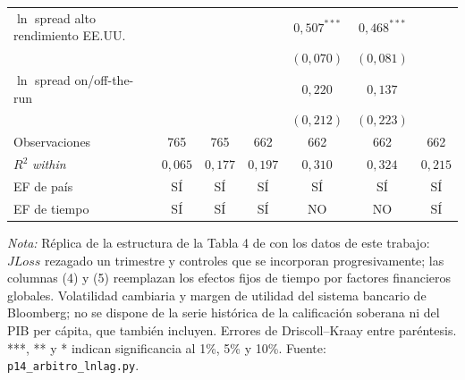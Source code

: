 \begin{table}[htbp]
\begin{tabular}{lcccccc}
$\ln$ spread alto rendimiento EE.UU. &  &  &  & $0{,}507^{***}$ & $0{,}468^{***}$ &  \\
 &  &  &  & $(0{,}070)$ & $(0{,}081)$ &  \\
$\ln$ spread on/off-the-run &  &  &  & $0{,}220$ & $0{,}137$ &  \\
 &  &  &  & $(0{,}212)$ & $(0{,}223)$ &  \\
\midrule
Observaciones & 765 & 765 & 662 & 662 & 662 & 662 \\
$R^2$ \textit{within} & $0{,}065$ & $0{,}177$ & $0{,}197$ & $0{,}310$ & $0{,}324$ & $0{,}215$ \\
EF de país & SÍ & SÍ & SÍ & SÍ & SÍ & SÍ \\
EF de tiempo & SÍ & SÍ & SÍ & NO & NO & SÍ \\
\bottomrule
\end{tabular}
\par\smallskip\parbox{0.95\linewidth}{\scriptsize \textit{Nota:} Réplica de la estructura de la Tabla 4 de \citet{Chari2024b} con los datos de este trabajo: $JLoss$ rezagado un trimestre y controles que se incorporan progresivamente; las columnas (4) y (5) reemplazan los efectos fijos de tiempo por factores financieros globales. Volatilidad cambiaria y margen de utilidad del sistema bancario de Bloomberg; no se dispone de la serie histórica de la calificación soberana ni del PIB per cápita, que \citet{Chari2024b} también incluyen. Errores de Driscoll--Kraay entre paréntesis. ***, ** y * indican significancia al 1\%, 5\% y 10\%. Fuente: \texttt{p14\_arbitro\_lnlag.py}.}
\end{table}
